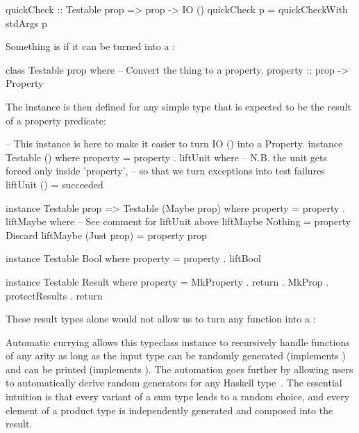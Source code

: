 \begin{code}[language=Haskell]
quickCheck :: Testable prop => prop -> IO ()
quickCheck p = quickCheckWith stdArgs p
\end{code}

\noindent Something is  if it can be turned into a :

\begin{code}[language=Haskell]
class Testable prop where
  -- Convert the thing to a property.
  property :: prop -> Property
\end{code}

\noindent The  instance is then defined for any simple type that is expected to
be the result of a property predicate:

\begin{code}[language=Haskell]
-- This instance is here to make it easier to turn IO () into a Property.
instance Testable () where
  property = property . liftUnit
    where
      -- N.B. the unit gets forced only inside 'property',
      -- so that we turn exceptions into test failures
      liftUnit () = succeeded

instance Testable prop => Testable (Maybe prop) where
  property = property . liftMaybe
    where
      -- See comment for liftUnit above
      liftMaybe Nothing = property Discard
      liftMaybe (Just prop) = property prop

instance Testable Bool where
  property = property . liftBool

instance Testable Result where
  property = MkProperty . return . MkProp . protectResults . return
\end{code}

\noindent These result types alone would not allow us to turn any function into a
:


Automatic currying allows this typeclass instance to recursively handle functions of
any arity as long as the input type can be randomly generated (implements
) and can be printed (implements ). The automation goes
further by allowing users to automatically derive random generators for any Haskell
type~\cite{genericRandom}. The essential intuition is that every variant of a sum type
leads to a random choice, and every element of a product type is independently
generated and composed into the result.

